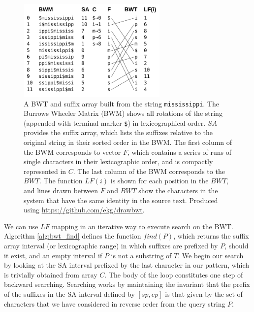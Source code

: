 \begin{figure}[htbp!]
  \centering
  \includegraphics[width=0.65\textwidth]{Chapter2/Figs/mississippi_bwt_construction.pdf}
  \caption[Building the BWT and suffix array]{
    A BWT and suffix array built from the string {\tt mississippi}.
    The Burrows Wheeler Matrix (BWM) shows all rotations of the string (appended with terminal marker {\tt \$}) in lexicographical order.
    $SA$ provides the suffix array, which lists the suffixes relative to the original string in their sorted order in the BWM.
    The first column of the BWM corresponds to vector $F$, which contains a series of runs of single characters in their lexicographic order, and is compactly represented in $C$.
    The last column of the BWM corresponds to the $BWT$.
    The function $LF(i)$ is shown for each position in the $BWT$, and lines drawn between $F$ and $BWT$ show the characters in the system that have the same identity in the source text.
    Produced using \url{https://github.com/ekg/drawbwt}.
  }
  \label{fig:bwt_construction}
\end{figure}

We can use $LF$ mapping in an iterative way to execute search on the BWT.
Algorithm \ref{alg:bwt_find} defines the function $find(P)$, which returns the suffix array interval (or lexicographic range) in which suffixes are prefixed by $P$, should it exist, and an empty interval if $P$ is not a substring of $T$.
We begin our search by looking at the SA interval prefixed by the last character in our pattern, which is trivially obtained from array $C$.
The body of the loop constitutes one step of backward searching.
Searching works by maintaining the invariant that the prefix of the suffixes in the SA interval defined by $[sp, ep]$ is that given by the set of characters that we have considered in reverse order from the query string $P$.

